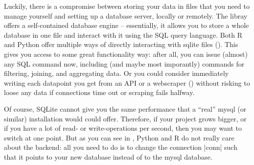 Luckily, there is a compromise between storing your data in files
that you need to manage yourself and setting up a database server,
locally or remotely. The libray  offers a self-contained
database engine -- essentially, it allows you to store a whole
database in one file and interact with it using the SQL query language.
Both R and Python offer multiple ways of directly interacting with
sqlite files (). This gives you access to some great
functionality way: after all, you can issue (almost) any SQL command
now, including (and maybe most imporantly) commands for filtering,
joining, and aggregating data. Or you could consider immediately writing
each datapoint you get from an API or a webscraper ()
without risking to loose any data if connections time out or scraping
fails halfway.


Of course, SQLite cannot give you the same performance that a ``real''
mysql (or similar) installation would could offer. Therefore, if your
project grows bigger, or if you have a lot of read- or
write-operations per second, then you may want to switch at one
point. But as you can see in , Python and R do not
really care about the backend: all you need to do is to change the
connection |conn| such that it points to your new database instead of
to the mysql database.


